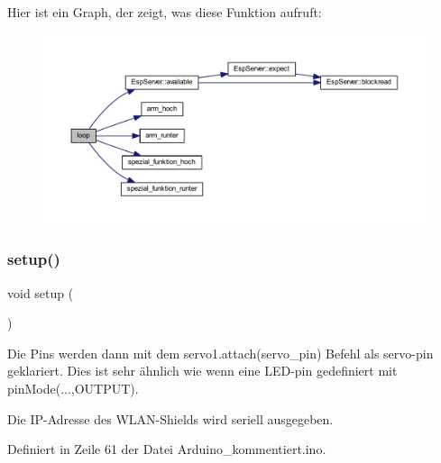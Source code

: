Hier ist ein Graph, der zeigt, was diese Funktion aufruft\+:\nopagebreak
\begin{figure}[H]
\begin{center}
\leavevmode
\includegraphics[width=350pt]{_arduino__kommentiert_8ino_afe461d27b9c48d5921c00d521181f12f_cgraph}
\end{center}
\end{figure}
\mbox{\label{_arduino__kommentiert_8ino_a4fc01d736fe50cf5b977f755b675f11d}} 
\subsubsection{\texorpdfstring{setup()}{setup()}}
{\footnotesize\ttfamily void setup (\begin{DoxyParamCaption}{ }\end{DoxyParamCaption})}

Die Pins werden dann mit dem servo1.\+attach(servo\+\_\+pin) Befehl als servo-\/pin geklariert. Dies ist sehr ähnlich wie wenn eine L\+E\+D-\/pin gedefiniert mit pin\+Mode(...,O\+U\+T\+P\+UT).

Die I\+P-\/\+Adresse des W\+L\+A\+N-\/\+Shields wird seriell ausgegeben. 

Definiert in Zeile 61 der Datei Arduino\+\_\+kommentiert.\+ino.


